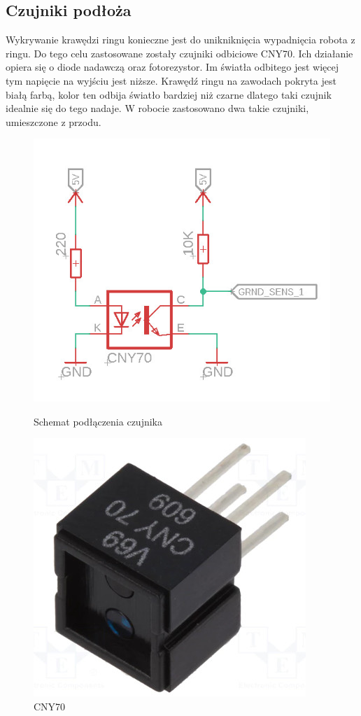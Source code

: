 \documentclass[polish,polish,a4paper]{article}
\begin{document}
    \subsection{Czujniki podłoża}
        Wykrywanie krawędzi ringu konieczne jest do unikniknięcia wypadnięcia robota z ringu. Do tego celu zastosowane zostały czujniki odbiciowe CNY70. Ich działanie opiera się o diode nadawczą oraz fotorezystor. Im światła odbitego jest więcej tym napięcie na wyjściu jest niższe. Krawędź ringu na zawodach pokryta jest białą farbą, kolor ten odbija światło bardziej niż czarne dlatego taki czujnik idealnie się do tego nadaje. W robocie zastosowano dwa takie czujniki, umieszczone z przodu.
        
        
        \begin{figure}[!htb]
       \begin{minipage}{0.3\textwidth}
         \centering
         \includegraphics[width=1.8\linewidth]{Scheme/czujniki_ziemi.jpg}
         \caption{Schemat podłączenia czujnika}\label{Fig:Data1}
       \end{minipage}\hfill
       \begin{minipage}{0.3\textwidth}
         \centering
         \includegraphics[width=.6\linewidth]{photo/Bez nazwy.jpg}
         \caption{CNY70}\label{Fig:Data2}
       \end{minipage}
        \end{figure}
        
\end{document}
